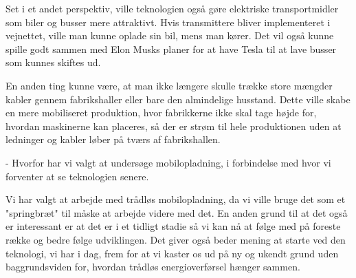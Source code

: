 Set i et andet perspektiv, ville teknologien også gøre elektriske transportmidler som biler og busser mere attraktivt. Hvis transmittere bliver implementeret i vejnettet, ville man kunne oplade sin bil, mens man kører. Det vil også kunne spille godt sammen med Elon Musks planer for at have Tesla til at lave busser som kunnes skiftes ud.

En anden ting kunne være, at man ikke længere skulle trække store mængder kabler gennem fabrikshaller eller bare den almindelige husstand. Dette ville skabe en mere mobiliseret produktion, hvor fabrikkerne ikke skal tage højde for, hvordan maskinerne kan placeres, så der er strøm til hele produktionen uden at ledninger og kabler løber på tværs af fabrikshallen.

 - Hvorfor har vi valgt at undersøge mobilopladning, i forbindelse med hvor vi forventer at se teknologien senere.
 
Vi har valgt at arbejde med trådløs mobilopladning, da vi ville bruge det som et "springbræt" til måske at arbejde videre med det. En anden grund til at det også er interessant er at det er i et tidligt stadie så vi kan nå at følge med på foreste række og bedre følge udviklingen. Det giver også beder mening at starte ved den teknologi, vi har i dag, frem for at vi kaster os ud på ny og ukendt grund uden baggrundsviden for, hvordan trådløs energioverførsel hænger sammen.

\newpage